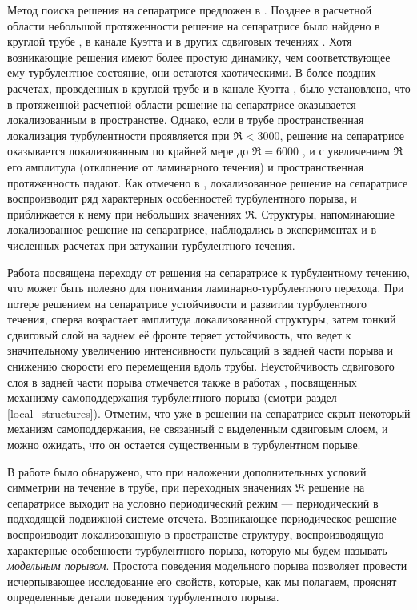 Метод поиска решения на сепаратрисе предложен в \cite{Skufca2006}. Позднее в расчетной области небольшой протяженности решение на сепаратрисе было найдено в круглой трубе \cite{Schneider2007}, в канале Куэтта \cite{Schneider2008} и в других сдвиговых течениях \cite{Kreilos2013}. Хотя возникающие решения имеют более простую динамику, чем соответствующее ему турбулентное состояние, они остаются хаотическими. В более поздних расчетах, проведенных в круглой трубе \cite{Mellibovsky2009transition} и в канале Куэтта \cite{Duguet2009}, было установлено, что в протяженной расчетной области решение на сепаратрисе оказывается локализованным в пространстве. Однако, если в трубе пространственная локализация турбулентности проявляется при $\Re < 3000$, решение на сепаратрисе оказывается локализованным по крайней мере до $\Re = 6000$ \cite{Duguet2010}, и с увеличением $\Re$ его амплитуда (отклонение от ламинарного течения) и пространственная протяженность падают. Как отмечено в \cite{Duguet2010, Avila2013}, локализованное решение на сепаратрисе воспроизводит ряд характерных особенностей турбулентного порыва, и приближается к нему при небольших значениях $\Re$. Структуры, напоминающие локализованное решение на сепаратрисе, наблюдались в экспериментах \cite{deLozar2012} и в численных расчетах \cite{Manneville2011} при затухании турбулентного течения. 

Работа \cite{Duguet2010} посвящена переходу от решения на сепаратрисе к турбулентному течению, что может быть полезно для понимания ламинарно-турбулентного перехода. При потере решением на сепаратрисе устойчивости и развитии турбулентного течения, сперва возрастает амплитуда локализованной структуры, затем тонкий сдвиговый слой на заднем её фронте теряет устойчивость, что ведет к значительному увеличению интенсивности пульсаций в задней части порыва и снижению скорости его перемещения вдоль трубы. Неустойчивость сдвигового слоя в задней части порыва отмечается также в работах \cite{Shimizu2009, Hof2010}, посвященных механизму самоподдержания турбулентного порыва (смотри раздел \ref{local_structures}). Отметим, что уже в решении на сепаратрисе скрыт некоторый механизм самоподдержания, не связанный с выделенным сдвиговым слоем, и можно ожидать, что он остается существенным в турбулентном порыве. 

В работе \cite{Avila2013} было обнаружено, что при наложении дополнительных условий симметрии на течение в трубе, при переходных значениях $\Re$ решение на сепаратрисе выходит на условно периодический режим --- периодический в подходящей подвижной системе отсчета. Возникающее периодическое решение воспроизводит локализованную в пространстве структуру, воспроизводящую характерные особенности турбулентного порыва, которую мы будем называть {\it модельным порывом}. Простота поведения модельного порыва позволяет провести исчерпывающее исследование его свойств, которые, как мы полагаем, прояснят определенные детали поведения турбулентного порыва. 


